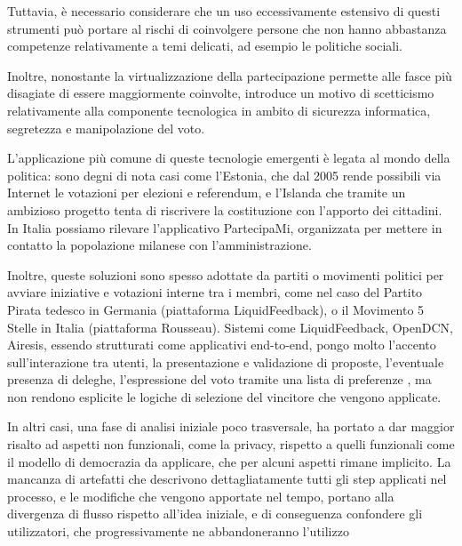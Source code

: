 \documentclass[12pt,a4paper,openright,twoside]{book}
\begin{document}
Tuttavia, è necessario considerare che un uso eccessivamente estensivo di questi strumenti
può portare al rischi di coinvolgere persone che non hanno abbastanza competenze relativamente 
a temi delicati, ad esempio le politiche sociali. 

Inoltre, nonostante la virtualizzazione della partecipazione permette alle fasce più disagiate di essere
maggiormente coinvolte, introduce un motivo di scetticismo relativamente alla componente tecnologica
in ambito di sicurezza informatica, segretezza e manipolazione del voto.

L'applicazione più comune di queste tecnologie emergenti è legata al mondo della politica:
sono degni di nota casi come l'Estonia, che dal 2005 rende possibili via Internet le votazioni
per elezioni e referendum, e l'Islanda che tramite un ambizioso progetto tenta di riscrivere 
la costituzione con l'apporto dei cittadini. In Italia possiamo rilevare l'applicativo PartecipaMi,
organizzata per mettere in contatto la popolazione milanese con l'amministrazione.

Inoltre, queste soluzioni sono spesso adottate da partiti o movimenti politici per avviare iniziative
e votazioni interne tra i membri, come nel caso del Partito Pirata tedesco in Germania (piattaforma LiquidFeedback),
o il Movimento 5 Stelle in Italia (piattaforma Rousseau).
Sistemi come LiquidFeedback, OpenDCN, Airesis, essendo strutturati come applicativi end-to-end,
pongo molto l'accento sull'interazione tra utenti, la presentazione e validazione di proposte,
l'eventuale presenza di deleghe, l'espressione del voto tramite una lista di preferenze \cite{Trapanese:2018}, ma
non rendono esplicite le logiche di selezione del vincitore che vengono applicate.

In altri casi, una fase di analisi iniziale poco trasversale, ha portato a dar maggior risalto
ad aspetti non funzionali, come la privacy, rispetto a quelli funzionali come il modello di democrazia
da applicare, che per alcuni aspetti rimane implicito. 
La mancanza di artefatti che descrivono dettagliatamente tutti gli step applicati nel
processo, e le modifiche che vengono apportate nel tempo, portano alla divergenza di flusso rispetto all'idea iniziale, 
e di conseguenza confondere gli utilizzatori, che progressivamente ne abbandoneranno l'utilizzo \cite{Pianini:2019}

\end{document}
